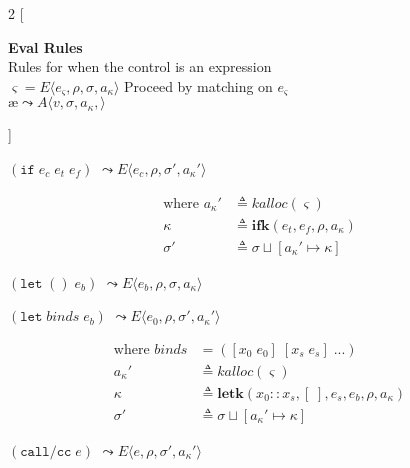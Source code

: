 \documentclass[12pt,draft]{article}
\newcommand\mae{\ensuremath{\text{\ae}}}
\newcommand{\ifsyn}[3]{(\texttt{if}\;#1\;#2\;#3)}
\newcommand{\callccsyn}[1]{(\texttt{call/cc}\;#1)}
\newcommand{\ctrl}[0]{e_{\varsigma}}
\newcommand{\env}[0]{\rho}
\newcommand{\store}[0]{\sigma}
\newcommand{\kaddr}[0]{a_{\kappa}}
\newcommand{\kont}[0]{\kappa}
\newcommand{\state}[0]{\varsigma}
\newcommand{\E}[4]{E\langle #1 , #2 , #3 , #4 \rangle}
\newcommand{\A}[4]{A\langle #1 , #2 , #3 , #4 \rangle}
\begin{document}
\footnotesize{
\begin{multicols*}{2}
[
\begin{center}
\textbf{Eval Rules} \\
Rules for when the control is an expression \\
\vspace{2mm}
$\state = \E{\ctrl}{\env}{\store}{\kaddr}$
Proceed by matching on $\ctrl$ \\
\vspace{3mm}
$\mae \leadsto \A{v}{\store}{\kaddr}{}$
\end{center}
]
\begin{center}
  $\ifsyn{e_c}{e_t}{e_f}$
  $\leadsto \E{e_c}{\env}{\store'}{\kaddr'}$
\end{center}
\vspace{-7mm}
\begin{align*}
  \text{where }
  \kaddr' &\triangleq kalloc(\state) \\
  \kont &\triangleq \textbf{ifk}(e_t , e_f , \env , \kaddr) \\
  \store' &\triangleq \store \sqcup [\kaddr' \mapsto \kont]
\end{align*}
\begin{center}
  $(\texttt{let}\;()\;e_b)$
  $\leadsto \E{e_b}{\env}{\store}{\kaddr}$
\end{center}
\vspace{-5mm}
\begin{center}
  $(\texttt{let}\;binds\;e_b)$
  $\leadsto \E{e_0}{\env}{\store'}{\kaddr'}$
\end{center}
\vspace{-7mm}
\begin{align*}
  \text{where }
  binds &= ([x_0\;e_0]\;[x_s\;e_s]\;...) \\
  \kaddr' &\triangleq kalloc(\state) \\
  \kont &\triangleq \textbf{letk}(x_0::x_s , [\;] , e_s , e_b , \env , \kaddr) \\
  \store' &\triangleq \store \sqcup [\kaddr' \mapsto \kont]
\end{align*}
\begin{center}
  $\callccsyn{e}$
  $\leadsto \E{e}{\env}{\store'}{\kaddr'}$

\end{center}
\end{multicols*}}
\end{document}
